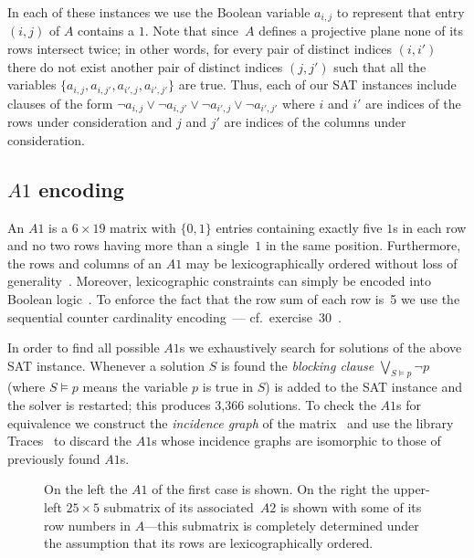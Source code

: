 \documentclass[letterpaper]{article}
\begin{document}
In each of these instances we use the Boolean variable $a_{i,j}$
to represent that entry $(i,j)$ of $A$ contains a $1$.
Note that since~$A$ defines a projective plane none of its rows
intersect twice; in other words, for every pair of distinct indices
$(i,i')$ there do not exist another pair of distinct indices $(j,j')$
such that all the variables $\{a_{i,j},a_{i,j'},a_{i',j},a_{i',j'}\}$ are true.
Thus, each of our SAT instances include clauses of the form
$\lnot a_{i,j}\lor\lnot a_{i,j'}\lor\lnot a_{i',j}\lor\lnot a_{i',j'}$
where $i$ and $i'$ are indices of the rows under consideration and $j$ and $j'$
are indices of the columns under consideration.

\subsection{\boldmath$A1$ encoding}\label{subsec:a1}

An $A1$ is a $6\times19$ matrix with $\{0,1\}$ entries containing
exactly five $1$s in each row and no two rows having more than
a single~$1$ in the same position.  Furthermore,
the rows and columns of an $A1$ may be lexicographically ordered
without loss of generality~\cite[cf.~exercise 495]{knuth2015art}.
Moreover, lexicographic constraints can simply be encoded into Boolean logic~\cite[cf.~equation 169]{knuth2015art}.
To enforce the fact that the row sum of each row is~5 we use the
sequential counter cardinality encoding~\cite{sinz2005towards}---%
cf.~exercise~30~\cite{knuth2015art}.

In order to find all possible $A1$s we exhaustively search for solutions
of the above SAT instance.  Whenever a solution $S$ is found the \emph{blocking
clause} $\bigvee_{S\models p}\lnot p$ (where $S\models p$
means the variable $p$ is true in $S$) is added to the SAT instance and the
solver is restarted; this produces 3,366 solutions.
To check the $A1$s for equivalence we construct
the \emph{incidence graph} of the matrix~\cite{kaski2006classification}
and use the library Traces~\cite{McKay201494} to discard the $A1$s
whose incidence graphs are isomorphic to those of previously found $A1$s.

\begin{figure}
\centering


\caption{On the left the $A1$ of the first case is shown.
On the right the upper-left
$25\times5$ submatrix of its associated~$A2$ is shown with some of its row numbers in $A$---this submatrix is
completely determined under the assumption that
its rows are lexicographically ordered.}\label{fig:a1a2}
\end{figure}
\end{document}
